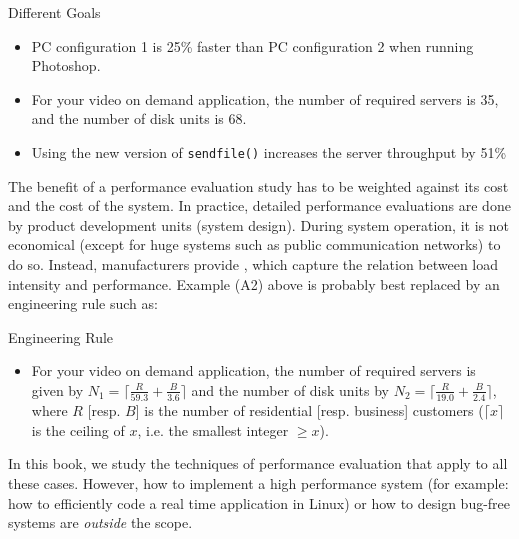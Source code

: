 \begin{ex}{Different Goals}
\begin{itemize}
  \item[(A1)] PC configuration 1 is 25\% faster than PC configuration 2
  when running Photoshop.
  \item[(A2)] For your video on demand application, the number of required servers is 35,
   and the number of disk units is $68$.
  \item[(A3)] Using the new version of \texttt{sendfile()} increases the server throughput by 51\%
\end{itemize}
\end{ex}

The benefit of a performance evaluation study has to be weighted
against its cost and the cost of the system. In practice, detailed
performance evaluations are done by product development units
(system design). During system operation, it is not economical
(except for huge systems such as public communication networks) to
do so. Instead, manufacturers provide , which
capture the relation between load intensity and performance. Example
(A2) above is probably best replaced by an engineering rule such as:
\begin{ex}{Engineering Rule}
\begin{itemize}
  \item[(E2)] For your video on demand application, the number of required servers is given by $N_1=\lceil
  \frac{R}{59.3}+\frac{B}{3.6}\rceil$ and the number of disk units by $N_2=\lceil
  \frac{R}{19.0}+\frac{B}{2.4}\rceil$, where $R$ [resp. $B$] is the number of residential [resp.
  business] customers ($\lceil x\rceil$ is the ceiling of $x$, i.e. the smallest integer $\geq x$).
\end{itemize}
\end{ex}
 In this book, we study the techniques of performance evaluation that apply
 to  all these cases. However, how to implement a high performance system
(for example: how to efficiently code a real time application in
Linux) or how to design bug-free systems are \emph{outside} the
scope.

